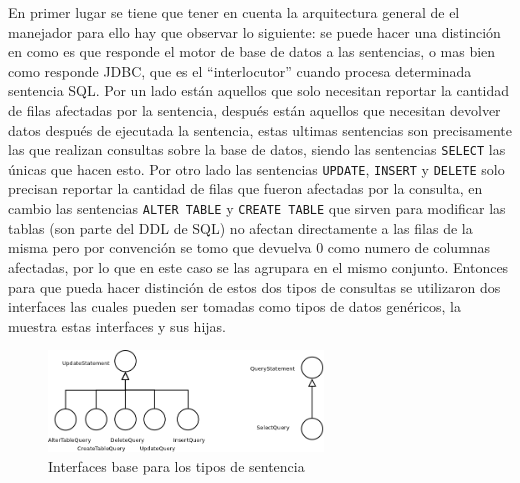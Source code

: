 En primer lugar se tiene que tener en cuenta la arquitectura general de el manejador para ello hay que observar lo siguiente: se puede hacer una distinción en como es que responde el motor de base de datos a las sentencias, o mas bien como responde JDBC, que es el ``interlocutor'' cuando procesa determinada sentencia SQL. Por un lado están aquellos que solo necesitan reportar la cantidad de filas afectadas por la sentencia, después están aquellos que necesitan devolver datos después de ejecutada la sentencia, estas ultimas sentencias son precisamente las que realizan consultas sobre la base de datos, siendo las sentencias \verb=SELECT= las únicas que hacen esto. Por otro lado las sentencias \verb=UPDATE=, \verb=INSERT= y \verb=DELETE= solo precisan reportar la cantidad de filas que fueron afectadas por la consulta, en cambio las sentencias \verb=ALTER TABLE= y \verb=CREATE TABLE= que sirven para modificar las tablas (son parte del DDL de SQL) no afectan directamente a las filas de la misma pero por convención se tomo que \jd devuelva 0 como numero de columnas afectadas, por lo que en este caso se las agrupara en el mismo conjunto. Entonces para que \jj pueda hacer distinción de estos dos tipos de consultas se utilizaron dos interfaces las cuales pueden ser tomadas como tipos de datos genéricos, la  muestra estas interfaces y sus hijas.
%
\begin{figure}[h]
  \centering
    \includegraphics[width=0.65\textwidth]{figuras/crossdb-base.png}
  \caption{Interfaces base para los tipos de sentencia}
  \label{fig:crossdb-base}
\end{figure}

